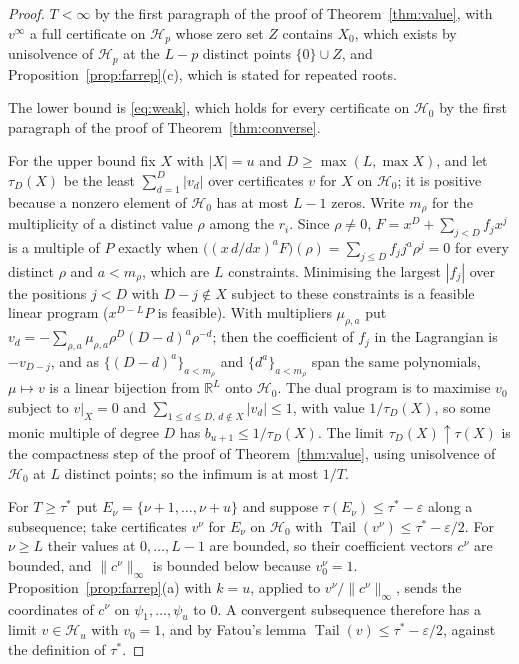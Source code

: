 \documentclass[11pt]{article}
\theoremstyle{definition}
\theoremstyle{plain}
\newcommand{\R}{\mathbb R}
\DeclareMathOperator{\Tail}{Tail}
\begin{document}
\begin{proof}
$T<\infty$ by the first paragraph of the proof of Theorem~\ref{thm:value},
with $v^\infty$ a full certificate on $\mathcal H_p$ whose zero set
$Z$ contains $X_0$, which exists by unisolvence of $\mathcal H_p$ at the
$L-p$ distinct points $\{0\}\cup Z$, and Proposition~\ref{prop:farrep}(c),
which is stated for repeated roots.

The lower bound is \eqref{eq:weak}, which holds for every certificate on
$\mathcal H_0$ by the first paragraph of the proof of
Theorem~\ref{thm:converse}.

For the upper bound fix $X$ with $|X|=u$ and $D\ge\max(L,\max X)$, and let
$\tau_D(X)$ be the least $\sum_{d=1}^D|v_d|$ over certificates $v$ for $X$
on $\mathcal H_0$; it is positive because a nonzero element of
$\mathcal H_0$ has at most $L-1$ zeros.  Write $m_\rho$ for the multiplicity
of a distinct value $\rho$ among the $r_i$.  Since $\rho\ne0$,
$F=x^D+\sum_{j<D}f_jx^j$ is a multiple of $P$ exactly when
$\bigl((x\,d/dx)^aF\bigr)(\rho)=\sum_{j\le D}f_jj^a\rho^j=0$ for every
distinct $\rho$ and $a<m_\rho$, which are $L$ constraints.  Minimising the
largest $|f_j|$ over the positions $j<D$ with $D-j\notin X$ subject to these
constraints is a feasible linear program ($x^{D-L}P$ is feasible).  With
multipliers $\mu_{\rho,a}$ put
$v_d=-\sum_{\rho,a}\mu_{\rho,a}\rho^D(D-d)^a\rho^{-d}$; then the coefficient
of $f_j$ in the Lagrangian is $-v_{D-j}$, and as $\{(D-d)^a\}_{a<m_\rho}$ and
$\{d^a\}_{a<m_\rho}$ span the same polynomials, $\mu\mapsto v$ is a linear
bijection from $\R^L$ onto $\mathcal H_0$.  The dual program is to maximise $v_0$
subject to $v|_X=0$ and $\sum_{1\le d\le D,\,d\notin X}|v_d|\le1$, with value
$1/\tau_D(X)$, so some monic multiple of degree $D$ has
$b_{u+1}\le1/\tau_D(X)$.  The limit $\tau_D(X)\uparrow\tau(X)$ is the
compactness step of the proof of Theorem~\ref{thm:value}, using unisolvence
of $\mathcal H_0$ at $L$ distinct points; so the infimum is at most $1/T$.

For $T\ge\tau^*$ put $E_\nu=\{\nu+1,\ldots,\nu+u\}$ and suppose
$\tau(E_\nu)\le\tau^*-\varepsilon$ along a subsequence; take certificates
$v^\nu$ for $E_\nu$ on $\mathcal H_0$ with
$\Tail(v^\nu)\le\tau^*-\varepsilon/2$.  For $\nu\ge L$ their values at
$0,\ldots,L-1$ are bounded, so their coefficient vectors $c^\nu$ are bounded,
and $\|c^\nu\|_\infty$ is bounded below because $v^\nu_0=1$.
Proposition~\ref{prop:farrep}(a) with $k=u$, applied to
$v^\nu/\|c^\nu\|_\infty$, sends the coordinates of $c^\nu$ on
$\psi_1,\ldots,\psi_u$ to $0$.  A convergent subsequence therefore has a
limit $v\in\mathcal H_u$ with $v_0=1$, and by Fatou's lemma
$\Tail(v)\le\tau^*-\varepsilon/2$, against the definition of $\tau^*$.
\end{proof}
\end{document}
